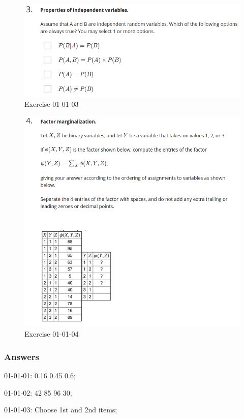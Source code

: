 \documentclass[12pt]{article}
\numberwithin{equation}{section}
\begin{document}
\begin{figure}[H]
  \includegraphics[width=\linewidth]{PGMpics/01-01-03.png}
  \caption{Exercise 01-01-03}
  \label{fig:01-01-03}
\end{figure}

\begin{figure}[H]
  \includegraphics[width=\linewidth]{PGMpics/01-01-04.png}
  \caption{Exercise 01-01-04}
  \label{fig:01-01-04}
\end{figure}

\subsubsection{Answers}
01-01-01: 0.16 0.45 0.6;

01-01-02: 42 85 96 30;

01-01-03: Choose 1st and 2nd items;
\end{document}
